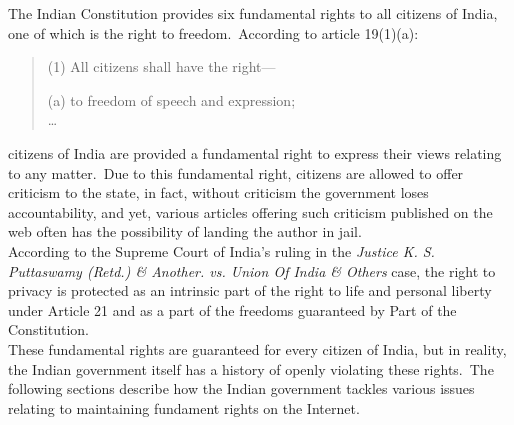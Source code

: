 \documentclass[11pt,a4paper,oneside]{scrarticle}
\begin{document}
    The Indian Constitution provides six fundamental rights to all citizens of India, one of which is the right to
    freedom.\ According to article 19(1)(a):
    \begin{quote}
        \singlespacing
        (1)
        All citizens shall have the right---\\
        \vspace*{-15pt}
        \begin{enumerate}
        (a)
            to freedom of speech and expression;\\
            \ldots
        \end{enumerate}
    \end{quote}
    citizens of India are provided a fundamental right to express their views relating to any matter.\ Due to this
    fundamental right, citizens are allowed to offer criticism to the state, in fact, without criticism the government
    loses accountability, and yet, various articles offering such criticism published on the web often has the
    possibility of landing the author in jail.
    \\
    According to the Supreme Court of India's ruling in the
    \textit{Justice K. S. Puttaswamy (Retd.) \& Another. vs. Union Of India \& Others} case, the right to privacy is
    protected as an intrinsic part of the right to life and personal liberty under Article 21 and as a part of the
    freedoms guaranteed by Part  of the Constitution.
    \\
    These fundamental rights are guaranteed for every citizen of India, but in reality, the Indian government itself has
    a history of openly violating these rights.\ The following sections describe how the Indian government tackles
    various issues relating to maintaining fundament rights on the Internet.
\end{document}
